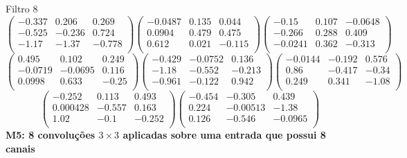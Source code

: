Filtro 8
{ \small
\[
\begin{pmatrix}
  -0.337 & 0.206 & 0.269 \\
  -0.525 & -0.236 & 0.724 \\
  -1.17 & -1.37 & -0.778 \\
\end{pmatrix}
\begin{pmatrix}
  -0.0487 & 0.135 & 0.044 \\
  0.0904 & 0.479 & 0.475 \\
  0.612 & 0.021 & -0.115 \\
\end{pmatrix}
\begin{pmatrix}
  -0.15 & 0.107 & -0.0648 \\
  -0.266 & 0.288 & 0.409 \\
  -0.0241 & 0.362 & -0.313 \\
\end{pmatrix}
\]
\[
\begin{pmatrix}
  0.495 & 0.102 & 0.249 \\
  -0.0719 & -0.0695 & 0.116 \\
  0.0998 & 0.633 & -0.25 \\
\end{pmatrix}
\begin{pmatrix}
  -0.429 & -0.0752 & 0.136 \\
  -1.18 & -0.552 & -0.213 \\
  -0.961 & -0.122 & 0.942 \\
\end{pmatrix}
\begin{pmatrix}
  -0.0144 & -0.192 & 0.576 \\
  0.86 & -0.417 & -0.34 \\
  0.249 & 0.341 & -1.08 \\
\end{pmatrix}
\]
\[
\begin{pmatrix}
  -0.252 & 0.113 & 0.493 \\
  0.000428 & -0.557 & 0.163 \\
  1.02 & -0.1 & -0.252 \\
\end{pmatrix}
\begin{pmatrix}
  -0.454 & -0.305 & 0.439 \\
  0.224 & -0.00513 & -1.38 \\
  0.126 & -0.546 & -0.0965 \\
\end{pmatrix}
\]
}
\textbf{M5: 8 convoluções $3 \times 3$ aplicadas sobre uma entrada que 
possui 8 canais}

